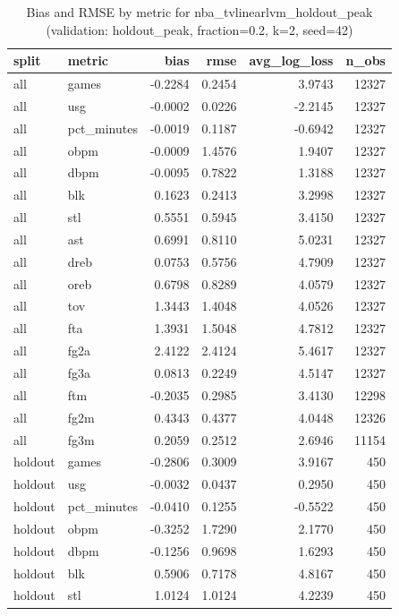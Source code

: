 \begin{table}
\caption{Bias and RMSE by metric for nba_tvlinearlvm_holdout_peak (validation: holdout_peak, fraction=0.2, k=2, seed=42)}
\label{tab:nba_tvlinearlvm_holdout_peak_vs_holdout_peak_f20_k2_s42_bias_rmse}
\begin{tabular}{llrrrr}
\toprule
split & metric & bias & rmse & avg\_log\_loss & n\_obs \\
\midrule
all & games & -0.2284 & 0.2454 & 3.9743 & 12327 \\
all & usg & -0.0002 & 0.0226 & -2.2145 & 12327 \\
all & pct\_minutes & -0.0019 & 0.1187 & -0.6942 & 12327 \\
all & obpm & -0.0009 & 1.4576 & 1.9407 & 12327 \\
all & dbpm & -0.0095 & 0.7822 & 1.3188 & 12327 \\
all & blk & 0.1623 & 0.2413 & 3.2998 & 12327 \\
all & stl & 0.5551 & 0.5945 & 3.4150 & 12327 \\
all & ast & 0.6991 & 0.8110 & 5.0231 & 12327 \\
all & dreb & 0.0753 & 0.5756 & 4.7909 & 12327 \\
all & oreb & 0.6798 & 0.8289 & 4.0579 & 12327 \\
all & tov & 1.3443 & 1.4048 & 4.0526 & 12327 \\
all & fta & 1.3931 & 1.5048 & 4.7812 & 12327 \\
all & fg2a & 2.4122 & 2.4124 & 5.4617 & 12327 \\
all & fg3a & 0.0813 & 0.2249 & 4.5147 & 12327 \\
all & ftm & -0.2035 & 0.2985 & 3.4130 & 12298 \\
all & fg2m & 0.4343 & 0.4377 & 4.0448 & 12326 \\
all & fg3m & 0.2059 & 0.2512 & 2.6946 & 11154 \\
holdout & games & -0.2806 & 0.3009 & 3.9167 & 450 \\
holdout & usg & -0.0032 & 0.0437 & 0.2950 & 450 \\
holdout & pct\_minutes & -0.0410 & 0.1255 & -0.5522 & 450 \\
holdout & obpm & -0.3252 & 1.7290 & 2.1770 & 450 \\
holdout & dbpm & -0.1256 & 0.9698 & 1.6293 & 450 \\
holdout & blk & 0.5906 & 0.7178 & 4.8167 & 450 \\
holdout & stl & 1.0124 & 1.0124 & 4.2239 & 450 \\

\end{tabular}
\end{table}
